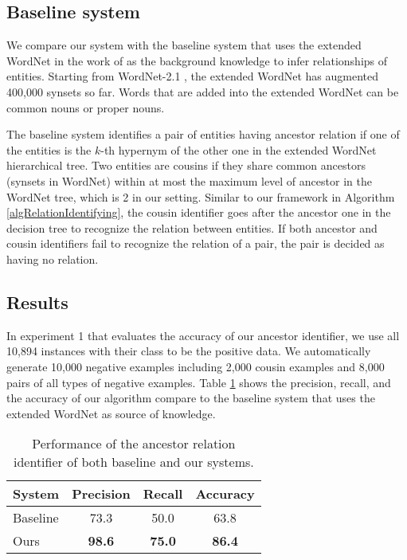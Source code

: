 \subsection{Baseline system}
\label{sec:baseline}
We compare our system with the baseline system that uses the extended WordNet in the work of \cite{Snow2006} as the background knowledge to infer relationships of entities. Starting from WordNet-2.1 \cite{Fellbaum98}, the extended WordNet has augmented 400,000 synsets so far. Words that are added into the extended WordNet can be common nouns or proper nouns.

The baseline system identifies a pair of entities having ancestor relation if one of the entities is the $k$-th hypernym of the other one in the extended WordNet hierarchical tree. Two entities are cousins if they share common ancestors (synsets in WordNet) within at most the maximum level of ancestor in the WordNet tree, which is 2 in our setting. Similar to our framework in Algorithm \ref{algRelationIdentifying}, the cousin identifier goes after the ancestor one in the decision tree to recognize the relation between entities. If both ancestor and cousin identifiers fail to recognize the relation of a pair, the pair is decided as having no relation. 


\subsection{Results}
\label{sec:result}

In experiment 1 that evaluates the accuracy of our ancestor identifier, we use all 10,894 instances with their class to be the positive data. We automatically generate 10,000 negative examples including 2,000 cousin examples and 8,000 pairs of all types of negative examples. Table \ref{table:exp1} shows the precision, recall, and the accuracy of our algorithm compare to the baseline system that uses the extended WordNet as source of knowledge.

\begin{table}[ht]
{\small
  \centering
  \begin{tabular}{|l|c|c|c|}
    \hline
    {\bf System} & {\bf Precision} & {\bf Recall} & {\bf Accuracy} \\
    \hline
    \hline
    Baseline	& 73.3 & 50.0 & 63.8 \\
    \hline
    Ours	& {\bf 98.6} & {\bf 75.0} & {\bf 86.4} \\
    \hline
  \end{tabular}
  \caption{Performance of the ancestor relation identifier of both baseline and our systems.}
  \label{table:exp1}
  }
\end{table}

